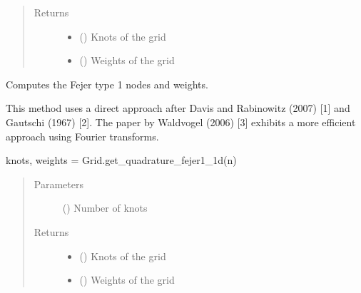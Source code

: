 \documentclass[letterpaper,10pt,english,openany,oneside]{sphinxmanual}
\begin{document}
\begin{fulllineitems}
\begin{fulllineitems}
\begin{quote}
\begin{description}
\item[{Returns}] \leavevmode
\begin{itemize}
\item {} 
 () \textendash{} Knots of the grid

\item {} 
 () \textendash{} Weights of the grid

\end{itemize}


\end{description}\end{quote}

\end{fulllineitems}


\begin{fulllineitems}
\label{\detokenize{pygpc:pygpc.Grid.Grid.get_quadrature_fejer1_1d}}
Computes the Fejer type 1 nodes and weights.

This method uses a direct approach after Davis and Rabinowitz (2007) {[}1{]} and Gautschi (1967) {[}2{]}.
The paper by Waldvogel (2006) {[}3{]} exhibits a more efficient approach using Fourier transforms.

knots, weights = Grid.get\_quadrature\_fejer1\_1d(n)
\begin{quote}\begin{description}
\item[{Parameters}] \leavevmode
{} () \textendash{} Number of knots

\item[{Returns}] \leavevmode
\begin{itemize}
\item {} 
 () \textendash{} Knots of the grid

\item {} 
 () \textendash{} Weights of the grid

\end{itemize}



\end{description}
\end{quote}
\end{fulllineitems}
\end{fulllineitems}
\end{document}
